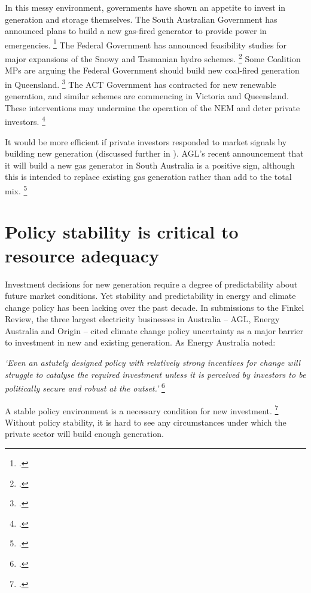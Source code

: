 \documentclass[FrontPage]{grattan}
\begin{document}
In this messy environment, governments have shown an appetite to invest in generation and storage themselves. The South Australian Government has announced plans to build a new gas-fired generator to provide power in emergencies.%
\footcite{SAGovt2017SAPlan}
The Federal Government has announced feasibility studies for major expansions of the Snowy and Tasmanian hydro schemes.%
\footcites{Massola2017SnowyHydroAnnouncement}{Turnbull2017TassieHydro}
Some Coalition MPs are arguing the Federal Government should build new coal-fired generation in Queensland.%
\footcite{Crowe2017CoalitionNewCoal}
The ACT Government has contracted for new renewable generation, and similar schemes are commencing in Victoria and Queensland. These interventions may undermine the operation of the NEM and deter private investors.%
\footcite{WoodBlowers-2017-Powering-Through}

It would be more efficient if private investors responded to market signals by building new generation (discussed further in ). AGL's recent announcement that it will build a new gas generator in South Australia is a positive sign, although this is intended to replace existing gas generation rather than add to the total mix.%
\footcite{ABC2017AGLnewpowerstation}

\section{Policy stability is critical to resource adequacy}\label{sec:policy-stability-critical-to-resource-adequacy}
Investment decisions for new generation require a degree of predictability about future market conditions. Yet stability and predictability in energy and climate change policy has been lacking over the past decade. In submissions to the Finkel Review, the three largest electricity businesses in Australia -- AGL, Energy Australia and Origin -- cited climate change policy uncertainty as a major barrier to investment in new and existing generation. As Energy Australia noted:

\emph{`Even an astutely designed policy with relatively strong incentives for change will struggle to catalyse the required investment unless it is perceived by investors to be politically secure and robust at the outset.'}%
\footcite{EA2017FinkelSubmission}

A stable policy environment is a necessary condition for new investment.%
\footcites{WoodBlowers-2017-Powering-Through}{WoodBlowers-2016-Keeping-the-lights-on-SA}
Without policy stability, it is hard to see any circumstances under which the private sector will build enough generation.
\end{document}
